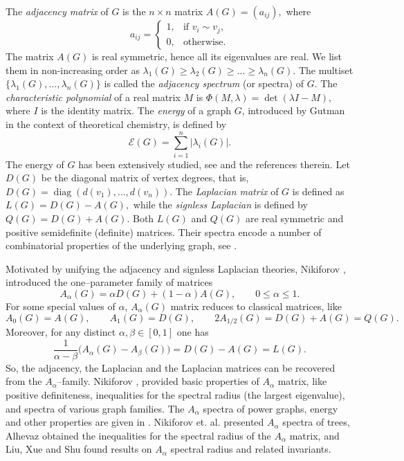 \documentclass[12pt,twoside]{article}
\begin{document}
	The \emph{adjacency matrix} of $G$ is the $n\times n$ matrix $A(G)=(a_{ij}),$ where
	\[
	a_{ij} =
	\begin{cases}
		1, & \text{if } v_i\sim v_j,\\[2pt]
		0, & \text{otherwise}.
	\end{cases}
	\]
	The matrix $A(G)$ is real symmetric, hence all its eigenvalues are real. We list them in
	non-increasing order as $\lambda_1(G)\geq \lambda_2(G)\geq \dots \geq \lambda_n(G).$
	The multiset $\{\lambda_1(G),\dots,\lambda_n(G)\}$ is called the \emph{adjacency spectrum} (or spectra) of $G$.
	The \emph{characteristic polynomial} of a real matrix $M$ is $\Phi(M,\lambda) = \det(\lambda I - M),$
	where $I$ is the identity matrix. The \emph{energy} of a graph $G$, introduced by Gutman
	in the context of theoretical chemistry, is defined by
	\[
	\mathcal{E}(G) = \sum_{i=1}^n |\lambda_i(G)|.
	\]
	The energy of $G$ has been extensively studied, see
	\cite{gutman2010,filipovski,shi,nv} and the references therein. Let $D(G)$ be the diagonal matrix of vertex degrees, that is, $D(G) = \operatorname{diag}(d(v_1),\dots,d(v_n)).$ 	The \emph{Laplacian matrix} of $G$ is defined as $	L(G) = D(G)-A(G),$	while the \emph{signless Laplacian} is defined by $Q(G) = D(G)+A(G).$
	Both $L(G)$ and $Q(G)$ are real symmetric and positive semidefinite (definite) matrices. Their spectra
	encode a number of combinatorial properties of the underlying graph, see
	\cite{cds,brouwer-haemers}.
	
	Motivated by unifying the adjacency and signless Laplacian theories, Nikiforov	\cite{nikiforov-aalpha}, introduced the one–parameter family of matrices
	\[
	A_{\alpha}(G) = \alpha D(G) + (1-\alpha)A(G),\qquad 0\leq \alpha\leq 1.
	\]
	For some special values of $\alpha$, $A_\alpha(G)$ matrix reduces to classical matrices, like
	\[
	A_0(G) = A(G),\qquad
	A_1(G) = D(G),\qquad
	2A_{1/2}(G) = D(G)+A(G)=Q(G).
	\]
	Moreover, for any distinct $\alpha,\beta\in[0,1]$ one has
	\[
	\frac{1}{\alpha-\beta}\bigl(A_\alpha(G)-A_\beta(G)\bigr)
	= D(G)-A(G)=L(G).
	\]
	So, the adjacency, the Laplacian and the  Laplacian matrices can  be recovered from the $A_\alpha$–family. Nikiforov \cite{nikiforov-aalpha}, provided basic properties of $A_\alpha$ matrix, like positive definiteness, inequalities for the spectral radius (the largest eigenvalue), and spectra of various graph families. The $A_{\alpha}$ spectra of power graphs, energy and other properties are given in \cite{bilalaims,bilalakcej,bilaljaa}. Nikiforov et. al. \cite{NikiforovTrees} presented $A_{\alpha}$ spectra of trees, Alhevaz \cite{AAlphaBounds} obtained the inequalities for the spectral radius of the $A_{\alpha}$ matrix, and Liu, Xue and Shu \cite{LinXueShu2018} found results on $A_\alpha$ spectral radius and related invariants.
	
\end{document}
